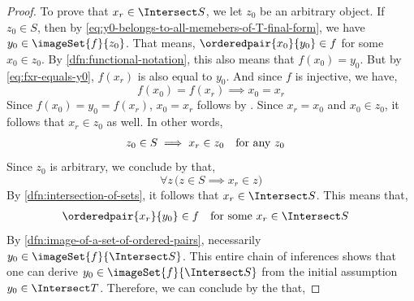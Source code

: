 \begin{proof}
    \vspace{0.5cm}
    \noindent
    To prove that \( x_{r} \in \Intersect S \), we let \( z_{0} \) be an arbitrary object. If \( z_{0} \in S \),
    then by \eqref{eq:y0-belongs-to-all-memebers-of-T-final-form}, we have \( y_{0} \in \imageSet{f}{z_{0}} \).
    That means, \( \orderedpair{x_{0}}{y_{0}} \in f \) for some \( x_{0} \in z_{0} \). By \cref{dfn:functional-notation},
    this also means that \( f(x_{0}) = y_{0} \). But by \eqref{eq:fxr-equals-y0}, \( f(x_{r}) \) is also equal to \( y_{0} \).
    And since \( f \) is injective, we have,
    \begin{equation*}
        f(x_{0}) = f(x_{r}) \implies x_{0} = x_{r}
    \end{equation*}
    Since \( f(x_{0}) = y_{0} = f(x_{r}) \), \( x_{0} = x_{r} \) follows by .
    Since \( x_{r} = x_{0} \) and \( x_{0} \in z_{0} \), it follows that \( x_{r} \in z_{0} \) as well. In other words,
    \begin{equation*}
        \begin{aligned}
            z_{0} \in S \implies x_{r} \in z_{0}&
        \end{aligned}
        \begin{aligned}
            &\text{for any \( z_{0} \)}
        \end{aligned}
    \end{equation*}
    Since \( z_{0} \) is arbitrary, we conclude by  that,
    \begin{equation*}
        \forall z \, \big( z \in S \implies x_{r} \in z \big)
    \end{equation*}
    By \cref{dfn:intersection-of-sets}, it follows that \( x_{r} \in \Intersect S \).
    This means that,
    \begin{equation*}
        \begin{aligned}
            \orderedpair{x_{r}}{y_{0}} \in f&
        \end{aligned}
        \begin{aligned}
            &\text{for some \( x_{r} \in \Intersect S \)}
        \end{aligned}
    \end{equation*}
    By \cref{dfn:image-of-a-set-of-ordered-pairs}, necessarily \( y_{0} \in \imageSet{f}{\Intersect S} \).
    This entire chain of inferences shows that one can derive \( y_{0} \in \imageSet{f}{\Intersect S} \) from
    the initial assumption \( y_{0} \in \Intersect T \). Therefore, we can conclude by the  that,

\end{proof}

